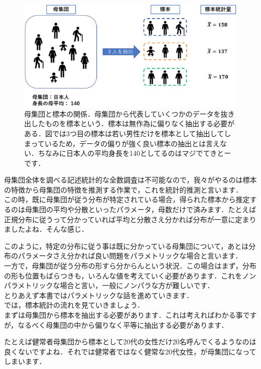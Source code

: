 \documentclass[11pt,a4paper]{ujreport} 	%
\begin{document}
\begin{figure}[H]
  \centering
  \includegraphics[width=12cm]{../figures/sampling.eps}
  \caption{母集団と標本の関係．母集団から代表していくつかのデータを抜き出したものを標本という．標本は無作為に偏りなく抽出する必要がある．図では3つ目の標本は若い男性だけを標本として抽出してしまっているため，データの偏りが強く良い標本の抽出とは言えない．ちなみに日本人の平均身長を140としてるのはマジでてきとーです．}
\end{figure}

母集団全体を調べる記述統計的な全数調査は不可能なので，我々がやるのは標本の特徴から母集団の特徴を推測する作業で，これを統計的推測と言います．\\

この時，既に母集団が従う分布が特定されている場合，得られた標本から推定するのは母集団の平均や分散といったパラメータ，母数だけで済みます．たとえば正規分布に従うって分かっていれば平均と分散さえ分かれば分布が一意に定まりましたよね．そんな感じ．

このように，特定の分布に従う事は既に分かっている母集団について，あとは分布のパラメータさえ分かれば良い問題をパラメトリックな場合と言います．\\

一方で，母集団が従う分布の形すら分からんという状況．この場合はまず，分布の形も位置もばらつきも，いろんな値を考えていく必要があります．これをノンパラメトリックな場合と言い，一般にノンパラな方が難しいです．\\

とりあえず本書ではパラメトリックな話を進めていきます．\\

では，標本統計の流れを見ていきましょう．\\

まずは母集団から標本を抽出する必要があります．これは考えればわかる事ですが，なるべく母集団の中から偏りなく平等に抽出する必要があります．

たとえば健常者母集団から標本として20代の女性だけ20名呼んでくるようなのは良くないですよね．それでは健常者ではなく健常な20代女性，が母集団になってしまいます．\\
\end{document}
